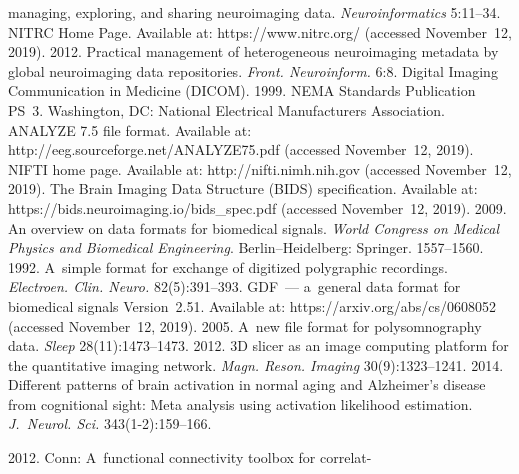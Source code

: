 \begin{multicols}{2}
{{\begin{thebibliography}{99}
managing, exploring, and sharing neuroimaging data. 
\textit{Neuroinformatics} 5:11--34.
NITRC Home Page. Available at: {\sf https://www.nitrc.org/} (accessed 
November~12, 2019).
 2012. Practical 
management of heterogeneous neuroimaging metadata by global neuroimaging 
data repositories. \textit{Front. Neuroinform.} 6:8.
Digital Imaging Communication in Medicine (DICOM). 1999. NEMA Standards 
Publication PS~3. Washington, DC: National Electrical Manufacturers 
Association.
ANALYZE 7.5 file format. Available at: {\sf 
http://eeg.\linebreak sourceforge.net/ANALYZE75.pdf} (accessed November~12, 2019).
NIFTI home page. Available at: {\sf http://nifti.nimh.nih.gov} (accessed 
November~12, 2019).
The Brain Imaging Data Structure (BIDS) specification. Available at: {\sf 
https://bids.neuroimaging.io/bids\_spec.pdf} (accessed November~12, 2019).
 2009. An overview on data formats for 
biomedical signals. \textit{World Congress on Medical Physics and 
Biomedical Engineering}. Berlin--Heidelberg: Springer. 1557--1560.
 1992. A~simple format for exchange of digitized polygraphic 
recordings. \textit{Electroen. Clin. Neuro.} 
82(5):391--393.
 GDF~--- a~general data format for 
biomedical signals Version~2.51. Available at: {\sf 
https://arxiv.org/\linebreak abs/cs/0608052} (accessed November~12, 2019).
 2005. A~new file 
format for polysomnography data. \textit{Sleep} 28(11):1473--1473.
 2012. 3D 
slicer as an image computing platform for the quantitative imaging network. 
\textit{Magn. Reson. Imaging} 30(9):1323--1241. 
 2014. Different patterns of brain activation in normal aging 
and Alzheimer's disease from cognitional sight: Meta analysis using activation 
likelihood estimation. \textit{J.~Neurol. Sci.} 343(1-2):159--166.



 2012. Conn: A~functional 
connectivity toolbox for correlat-\linebreak\vspace*{-12pt}


\end{thebibliography}}}
\end{multicols}

